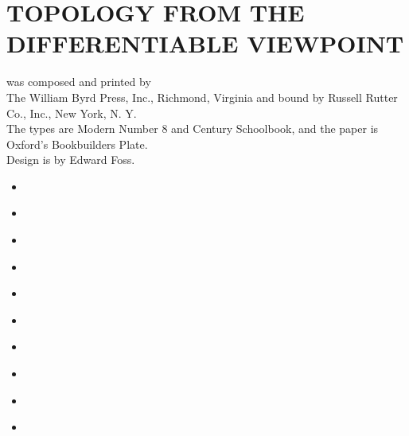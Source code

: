 \documentclass[10pt, letterpaper]{article}
\begin{document}
\section*{TOPOLOGY FROM THE DIFFERENTIABLE VIEWPOINT}
was composed and printed by\\
The William Byrd Press, Inc., Richmond, Virginia and bound by Russell Rutter Co., Inc., New York, N. Y.\\
The types are Modern Number 8 and Century Schoolbook, and the paper is Oxford's Bookbuilders Plate.\\
Design is by Edward Foss.

\begin{itemize}
  \item 
\end{itemize}

\begin{itemize}
  \item 
\end{itemize}

\begin{itemize}
  \item 
\end{itemize}

\begin{itemize}
  \item 
\end{itemize}

\begin{itemize}
  \item 
\end{itemize}

\begin{itemize}
  \item 
\end{itemize}

\begin{itemize}
  \item 
\end{itemize}

\begin{itemize}
  \item 
\end{itemize}

\begin{itemize}
  \item 
\end{itemize}

\begin{itemize}
  \item 
\end{itemize}
\end{document}
